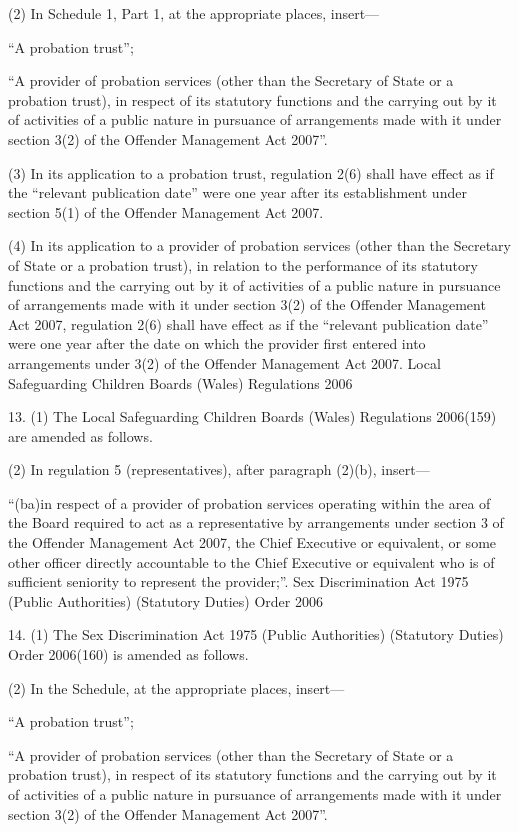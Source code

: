 \documentclass[12pt,a4paper]{article}
\begin{document}
(2) In Schedule 1, Part 1, at the appropriate places, insert—

“A probation trust”;

“A provider of probation services (other than the Secretary of State or a probation trust), in respect of its statutory functions and the carrying out by it of activities of a public nature in pursuance of arrangements made with it under section 3(2) of the Offender Management Act 2007”.

(3) In its application to a probation trust, regulation 2(6) shall have effect as if the “relevant publication date” were one year after its establishment under section 5(1) of the Offender Management Act 2007.

(4) In its application to a provider of probation services (other than the Secretary of State or a probation trust), in relation to the performance of its statutory functions and the carrying out by it of activities of a public nature in pursuance of arrangements made with it under section 3(2) of the Offender Management Act 2007, regulation 2(6) shall have effect as if the “relevant publication date” were one year after the date on which the provider first entered into arrangements under 3(2) of the Offender Management Act 2007.
Local Safeguarding Children Boards (Wales) Regulations 2006

13.  (1)  The Local Safeguarding Children Boards (Wales) Regulations 2006(159) are amended as follows.

(2) In regulation 5 (representatives), after paragraph (2)(b), insert—

“(ba)in respect of a provider of probation services operating within the area of the Board required to act as a representative by arrangements under section 3 of the Offender Management Act 2007, the Chief Executive or equivalent, or some other officer directly accountable to the Chief Executive or equivalent who is of sufficient seniority to represent the provider;”.
Sex Discrimination Act 1975 (Public Authorities) (Statutory Duties) Order 2006

14.  (1)  The Sex Discrimination Act 1975 (Public Authorities) (Statutory Duties) Order 2006(160) is amended as follows.

(2) In the Schedule, at the appropriate places, insert—

“A probation trust”;

“A provider of probation services (other than the Secretary of State or a probation trust), in respect of its statutory functions and the carrying out by it of activities of a public nature in pursuance of arrangements made with it under section 3(2) of the Offender Management Act 2007”.
\end{document}
